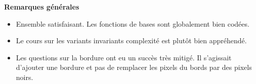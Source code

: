 \documentclass[10pt,fleqn]{book} %
\begin{document}

\pagestyle{fancy}
\thispagestyle{plain}


\def\columnseprulecolor{\color{ocre}}
\setlength{\columnseprule}{0pt} 



\vspace{6cm}
%

\textbf{Remarques générales}
\begin{itemize}
\item Ensemble satisfaisant. Les fonctions de bases sont globalement bien codées. 
\item Le cours sur les variants invariants complexité est plutôt bien appréhendé. 
\item Les questions sur la bordure ont eu un succès très mitigé. Il s'agissait d'ajouter une bordure et pas de remplacer les pixels du bords par des pixels noirs. 
\end{itemize}



\end{document}

